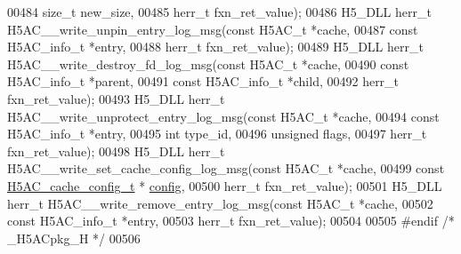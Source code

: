 \begin{DoxyCode}
00484                                                \textcolor{keywordtype}{size\_t} new\_size,
00485                                                herr\_t fxn\_ret\_value);
00486 H5\_DLL herr\_t H5AC\_\_write\_unpin\_entry\_log\_msg(\textcolor{keyword}{const} H5AC\_t *cache,
00487                                               \textcolor{keyword}{const} H5AC\_info\_t *entry,
00488                                               herr\_t fxn\_ret\_value);
00489 H5\_DLL herr\_t H5AC\_\_write\_destroy\_fd\_log\_msg(\textcolor{keyword}{const} H5AC\_t *cache,
00490                                              \textcolor{keyword}{const} H5AC\_info\_t *parent,
00491                                              \textcolor{keyword}{const} H5AC\_info\_t *child,
00492                                              herr\_t fxn\_ret\_value);
00493 H5\_DLL herr\_t H5AC\_\_write\_unprotect\_entry\_log\_msg(\textcolor{keyword}{const} H5AC\_t *cache,
00494                                                   \textcolor{keyword}{const} H5AC\_info\_t *entry,
00495                                                   \textcolor{keywordtype}{int} type\_id,
00496                                                   \textcolor{keywordtype}{unsigned} flags,
00497                                                   herr\_t fxn\_ret\_value);
00498 H5\_DLL herr\_t H5AC\_\_write\_set\_cache\_config\_log\_msg(\textcolor{keyword}{const} H5AC\_t *cache,
00499                                                    \textcolor{keyword}{const} \hyperlink{struct_h5_a_c__cache__config__t}{H5AC\_cache\_config\_t} *
      \hyperlink{structconfig__s}{config},
00500                                                    herr\_t fxn\_ret\_value);
00501 H5\_DLL herr\_t H5AC\_\_write\_remove\_entry\_log\_msg(\textcolor{keyword}{const} H5AC\_t *cache,
00502                                               \textcolor{keyword}{const} H5AC\_info\_t *entry,
00503                                               herr\_t fxn\_ret\_value);
00504 
00505 \textcolor{preprocessor}{#endif }\textcolor{comment}{/* \_H5ACpkg\_H */}\textcolor{preprocessor}{}
00506 
\end{DoxyCode}
